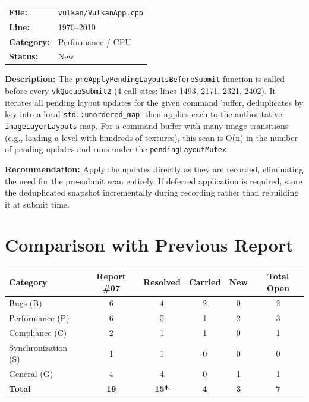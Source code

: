 \documentclass[a4paper,12pt]{article}
\begin{document}
\begin{enumerate}[leftmargin=*]
  \begin{tabular}{ll}
    \textbf{File:} & \texttt{vulkan/VulkanApp.cpp} \\
    \textbf{Line:} & 1970--2010 \\
    \textbf{Category:} & Performance / CPU \\
    \textbf{Status:} & New \\
  \end{tabular}

  \textbf{Description:}
  The \texttt{preApplyPendingLayoutsBeforeSubmit} function is called before
  every \texttt{vkQueueSubmit2} (4 call sites: lines 1493, 2171, 2321, 2402).
  It iterates all pending layout updates for the given command buffer,
  deduplicates by key into a local \texttt{std::unordered\_map}, then applies
  each to the authoritative \texttt{imageLayerLayouts} map. For a command
  buffer with many image transitions (e.g., loading a level with hundreds of
  textures), this scan is O(n) in the number of pending updates and runs
  under the \texttt{pendingLayoutMutex}.

  \textbf{Recommendation:}
  Apply the updates directly as they are recorded, eliminating the need for
  the pre-submit scan entirely. If deferred application is required, store
  the deduplicated snapshot incrementally during recording rather than
  rebuilding it at submit time.

\end{enumerate}

\newpage

\section{Comparison with Previous Report}

\begin{center}
\begin{tabular}{lccccc}
\toprule
\textbf{Category} & \textbf{Report \#07} & \textbf{Resolved} & \textbf{Carried} & \textbf{New} & \textbf{Total Open} \\
\midrule
Bugs (B)           & 6  & 4 & 2 & 0 & 2  \\
Performance (P)    & 6  & 5 & 1 & 2 & 3  \\
Compliance (C)     & 2  & 1 & 1 & 0 & 1  \\
Synchronization (S)& 1  & 1 & 0 & 0 & 0  \\
General (G)        & 4  & 4 & 0 & 1 & 1  \\
\midrule
\textbf{Total}     & \textbf{19} & \textbf{15*} & \textbf{4} & \textbf{3} & \textbf{7} \\
\bottomrule
\end{tabular}
\end{center}
\end{document}
